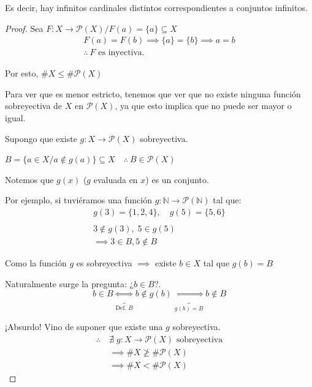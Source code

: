 Es decir, hay infinitos cardinales distintos correspondientes a conjuntos
infinitos.

\begin{proof} \phantom{.}

    Sea $F: X \to \mathcal{P}(X) / F(a) = \{a\} \subseteq X$
    \begin{gather*}
        F(a) = F(b) \implies \{a\} = \{b\} \implies a = b \\
        \therefore ~ F\text{ es inyectiva.}
    \end{gather*}

    Por esto, $\# X \leq \# \mathcal{P}(X)$

    Para ver que es menor estricto, tenemos que ver que no existe ninguna 
    función sobreyectiva de $X$ en $\mathcal{P}(X)$, ya que esto implica
    que no puede ser mayor o igual.

    Supongo que existe $g: X \to \mathcal{P}(X)$ sobreyectiva.

    $B = \{ a \in X / a \notin g(a) \} \subseteq X
    \quad \therefore ~ B \in \mathcal{P}(X)$ 

    \medskip
    Notemos que $g(x)$ ($g$ evaluada en $x$) es un conjunto.

    Por ejemplo, si tuviéramos una función
    $g: \mathbb{N} \to \mathcal{P}(\mathbb{N})$ tal que:
    \begin{gather*}
    g(3) = \{1,2,4\}, \quad g(5) = \{5,6\} \\
    \\
    3 \notin g(3), \; 5 \in g(5) \\ \implies 3 \in B, 5 \notin B
    \end{gather*}

    \medskip

    Como la función $g$ es sobreyectiva $\implies$ existe $b \in X$ tal que
    $g(b) = B$

    Naturalmente surge la pregunta: ¿$b \in B$?.
    \[ b \in B \underbrace{\iff }_{\text{Def. } B} b \notin g(b) 
        \underbrace{\iff}_{g(b)=B} b \notin B \]

    ¡Absurdo! Vino de suponer que existe una $g$ sobreyectiva.
    \begin{align*} 
        \therefore ~ &\nexists \; g:X \to\mathcal{P}(X) \text{ sobreyectiva}\\
        &\implies \# X \not\geq \# \mathcal{P}(X) \\
        &\implies \# X < \# \mathcal{P}(X)
    \end{align*}
\end{proof}

